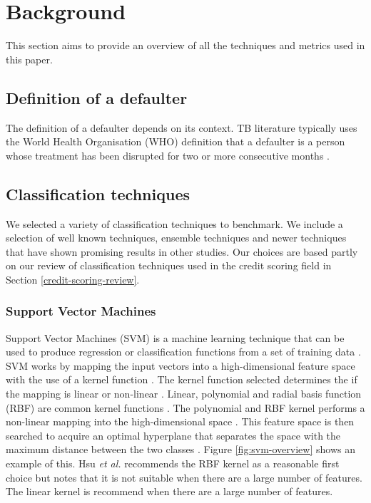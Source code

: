 \documentclass{sig-alternate-05-2015}
\begin{document}
	\section{Background}
	This section aims to provide an overview of all the techniques and metrics used in this paper.
	\subsection{Definition of a defaulter}
	The definition of a defaulter depends on its context. TB literature typically uses the World Health Organisation (WHO) definition that a defaulter is a person whose treatment has been disrupted for two or more consecutive months \cite{chan:2003prevalence, cherkaoui:19326203, Jha:10.1371/journal.pone.0008873,jittimanee:10.1111/j.1440-172X.2007.00650.x,muture:6660173120110101, world2015TB}.
	
	\subsection{Classification techniques}
	We selected a variety of classification techniques to benchmark. We include a selection of well known techniques, ensemble techniques and newer techniques that have shown promising results in other studies. Our choices are based partly on our review of classification techniques used in the credit scoring field in Section \ref{credit-scoring-review}.
	\subsubsection{Support Vector Machines}
	Support Vector Machines (SVM) is a machine learning technique that can be used to produce regression or classification functions from a set of training data \cite{Luo20097562}. SVM works by mapping the input vectors into a high-dimensional feature space with the use of a kernel function \cite{Danenas20153194}. The kernel function selected determines the if the mapping is linear or non-linear \cite{Luo20097562}. Linear, polynomial and radial basis function (RBF) are common kernel functions \cite{hsu2003practical}. The polynomial and RBF kernel performs a non-linear mapping into the high-dimensional space \cite{hsu2003practical}. This feature space is then searched to acquire an optimal hyperplane that separates the space with the maximum distance between the two classes \cite{Danenas20153194}. Figure \ref{fig:svm-overview} shows an example of this. Hsu \textit{et al.} \cite{hsu2003practical} recommends the RBF kernel as a reasonable first choice but notes that it is not suitable when there are a large number of features. The linear kernel is recommend when there are a large number of features.
	
\end{document}
